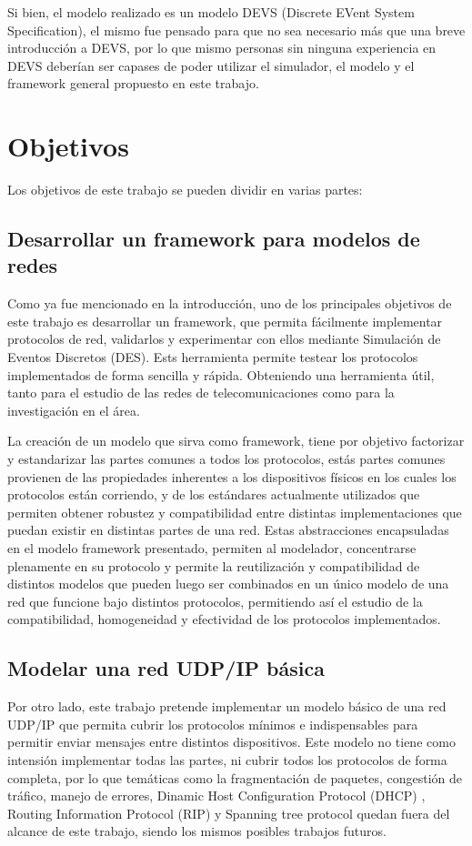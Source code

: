 \documentclass[10pt,a4paper]{article}
\begin{document}
Si bien, el modelo realizado es un modelo DEVS (Discrete EVent System Specification), el mismo fue pensado para que no sea necesario más que una breve introducción a DEVS, por lo que mismo personas sin ninguna experiencia en DEVS deberían ser capases de poder utilizar el simulador, el modelo y el framework general propuesto en este trabajo.

\section{Objetivos}

Los objetivos de este trabajo se pueden dividir en varias partes:
\subsection{Desarrollar un framework para modelos de redes}

Como ya fue mencionado en la introducción, uno de los principales objetivos de este trabajo es desarrollar un framework, que permita fácilmente implementar protocolos de red, validarlos y experimentar con ellos mediante Simulación de Eventos Discretos (DES). Ests herramienta permite testear los protocolos implementados de forma sencilla y rápida. Obteniendo una herramienta útil, tanto para el estudio de las redes de telecomunicaciones como para la investigación en el área. 

La creación de un modelo que sirva como framework, tiene por objetivo factorizar y estandarizar las partes comunes a todos los protocolos, estás partes comunes provienen de las propiedades inherentes a los dispositivos físicos en los cuales los protocolos están corriendo, y de los estándares actualmente utilizados que permiten obtener robustez y compatibilidad entre distintas implementaciones que puedan existir en distintas partes de una red. Estas abstracciones encapsuladas en el modelo framework presentado, permiten al modelador, concentrarse plenamente en su protocolo y permite la reutilización y compatibilidad de distintos modelos que pueden luego ser combinados en un único modelo de una red que funcione bajo distintos protocolos, permitiendo así el estudio de la compatibilidad, homogeneidad y efectividad de los protocolos implementados.

\subsection{Modelar una red UDP/IP básica}

Por otro lado, este trabajo pretende implementar un modelo básico de una red UDP/IP que permita cubrir los protocolos mínimos e indispensables para permitir enviar mensajes entre distintos dispositivos. Este modelo no tiene como intensión implementar todas las partes, ni cubrir todos los protocolos de forma completa, por lo que temáticas como la fragmentación de paquetes, congestión de tráfico, manejo de errores, Dinamic Host Configuration Protocol (DHCP) \cite[p.~231]{peterson2007computer}, Routing Information Protocol (RIP)\cite[p.~243]{peterson2007computer} y Spanning tree protocol \cite[p.~194]{peterson2007computer} quedan fuera del alcance de este trabajo, siendo los mismos posibles trabajos futuros.
\end{document}
